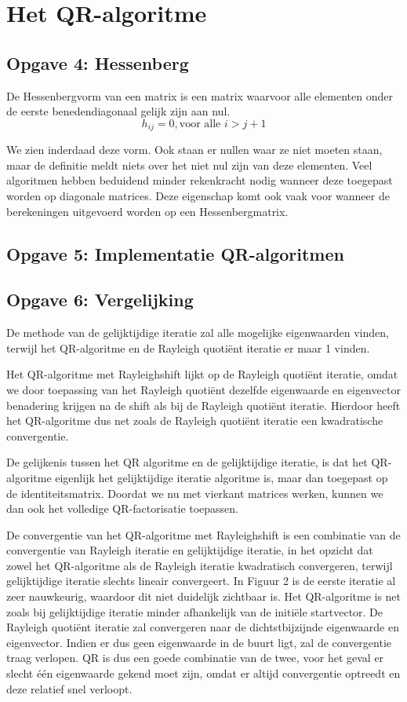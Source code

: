 \documentclass[a4paper]{article}
\newcommand{\opgave}[1]{\subsection{Opgave #1}}
\begin{document}
\section{Het QR-algoritme}\label{sec:QR}

\opgave{4: Hessenberg}\label{sec:oef4}

De Hessenbergvorm van een matrix is een matrix waarvoor alle elementen onder de eerste benedendiagonaal gelijk zijn aan nul.
\begin{equation}\nonumber
	h_{ij} =0 , \text{voor alle } i > j+1
\end{equation}

We zien inderdaad deze vorm. Ook staan er nullen waar ze niet moeten staan, maar de definitie meldt niets over het niet nul zijn van deze elementen. Veel algoritmen hebben beduidend minder rekenkracht nodig wanneer deze toegepast worden op diagonale matrices. Deze eigenschap komt ook vaak voor wanneer de berekeningen uitgevoerd worden op een Hessenbergmatrix.
\opgave{5: Implementatie QR-algoritmen}\label{sec:oef5}

\opgave{6: Vergelijking}\label{sec:oef6}

De methode van de gelijktijdige iteratie zal alle mogelijke eigenwaarden vinden, terwijl het 	 QR-algoritme en de Rayleigh quoti\"ent iteratie er maar 1 vinden. \par\noindent 
    Het QR-algoritme met Rayleighshift lijkt op de Rayleigh quoti\"ent iteratie, omdat we door 		toepassing van het Rayleigh quoti\"ent dezelfde eigenwaarde en eigenvector benadering krijgen 	  na de shift als bij de Rayleigh quoti\"ent iteratie. Hierdoor heeft het QR-algoritme dus net 		zoals de Rayleigh quoti\"ent iteratie een kwadratische convergentie. \par\noindent
    De gelijkenis tussen het QR algoritme en de gelijktijdige iteratie, is dat het QR-algoritme 	eigenlijk het gelijktijdige iteratie algoritme is, maar dan toegepast op de identiteitsmatrix. 	   Doordat we nu met vierkant matrices werken, kunnen we dan ook het volledige QR-factorisatie 		toepassen.
    \\ \par\noindent
    De convergentie van het QR-algoritme met Rayleighshift is een combinatie van de convergentie 	 van Rayleigh iteratie en gelijktijdige iteratie, in het opzicht dat zowel het QR-algoritme als 	de Rayleigh iteratie kwadratisch convergeren, terwijl gelijktijdige iteratie slechts lineair 	 convergeert. In Figuur 2 is de eerste iteratie al zeer nauwkeurig, waardoor dit niet duidelijk 	zichtbaar is. Het QR-algoritme is net zoals bij gelijktijdige iteratie minder afhankelijk van 	  de initi\"ele startvector. De Rayleigh quoti\"ent iteratie zal convergeren naar de 				dichtstbijzijnde eigenwaarde en eigenvector. Indien er dus geen eigenwaarde in de buurt ligt, 	  zal de convergentie traag verlopen. QR is dus een goede combinatie van de twee, voor het geval 	 er slecht \'e\'en eigenwaarde gekend moet zijn, omdat er altijd convergentie optreedt en deze 		relatief snel verloopt.
\end{document}

